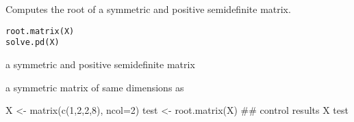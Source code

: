\begin{Description}\relax
Computes the root of a symmetric and positive semidefinite matrix.\end{Description}
\begin{Usage}
\begin{verbatim}
root.matrix(X)
solve.pd(X)
\end{verbatim}
\end{Usage}
\begin{Arguments}
\begin{ldescription}
\item[\code{X}] a symmetric and positive semidefinite matrix
\end{ldescription}
\end{Arguments}
\begin{Value}
a symmetric matrix of same dimensions as \end{Value}
\begin{Examples}
\begin{ExampleCode}
X <- matrix(c(1,2,2,8), ncol=2)
test <- root.matrix(X)
## control results
X
test %
\end{ExampleCode}
\end{Examples}

